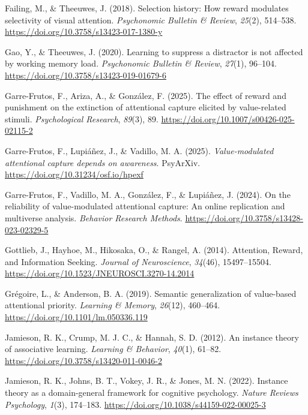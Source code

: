 \documentclass[
  jou,
  floatsintext,
  longtable,
  nolmodern,
  notxfonts,
  notimes,
  colorlinks=true,linkcolor=blue,citecolor=blue,urlcolor=blue]{apa7}
\newlength{\cslhangindent}
\newenvironment{CSLReferences}[2] %
 {\begin{list}{}{%
  \setlength{\itemindent}{0pt}
  \setlength{\leftmargin}{0pt}
  \setlength{\parsep}{0pt}
  \ifodd #1
   \setlength{\leftmargin}{\cslhangindent}
   \setlength{\itemindent}{-1\cslhangindent}
  \fi
  \setlength{\itemsep}{#2\baselineskip}}}
 {\end{list}}
\begin{document}
\begin{CSLReferences}{1}{0}
Failing, M., \& Theeuwes, J. (2018). Selection history: How reward
modulates selectivity of visual attention. \emph{Psychonomic Bulletin \&
Review}, \emph{25}(2), 514--538.
\url{https://doi.org/10.3758/s13423-017-1380-y}

Gao, Y., \& Theeuwes, J. (2020). Learning to suppress a distractor is
not affected by working memory load. \emph{Psychonomic Bulletin \&
Review}, \emph{27}(1), 96--104.
\url{https://doi.org/10.3758/s13423-019-01679-6}

Garre-Frutos, F., Ariza, A., \& González, F. (2025). The effect of
reward and punishment on the extinction of attentional capture elicited
by value-related stimuli. \emph{Psychological Research}, \emph{89}(3),
89. \url{https://doi.org/10.1007/s00426-025-02115-2}

Garre-Frutos, F., Lupiáñez, J., \& Vadillo, M. A. (2025).
\emph{Value-modulated attentional capture depends on awareness}.
PsyArXiv. \url{https://doi.org/10.31234/osf.io/hpexf}

Garre-Frutos, F., Vadillo, M. A., González, F., \& Lupiáñez, J. (2024).
On the reliability of value-modulated attentional capture: An online
replication and multiverse analysis. \emph{Behavior Research Methods}.
\url{https://doi.org/10.3758/s13428-023-02329-5}

Gottlieb, J., Hayhoe, M., Hikosaka, O., \& Rangel, A. (2014). Attention,
Reward, and Information Seeking. \emph{Journal of Neuroscience},
\emph{34}(46), 15497--15504.
\url{https://doi.org/10.1523/JNEUROSCI.3270-14.2014}

Grégoire, L., \& Anderson, B. A. (2019). Semantic generalization of
value-based attentional priority. \emph{Learning \& Memory},
\emph{26}(12), 460--464. \url{https://doi.org/10.1101/lm.050336.119}

Jamieson, R. K., Crump, M. J. C., \& Hannah, S. D. (2012). An instance
theory of associative learning. \emph{Learning \& Behavior},
\emph{40}(1), 61--82. \url{https://doi.org/10.3758/s13420-011-0046-2}

Jamieson, R. K., Johns, B. T., Vokey, J. R., \& Jones, M. N. (2022).
Instance theory as a domain-general framework for cognitive psychology.
\emph{Nature Reviews Psychology}, \emph{1}(3), 174--183.
\url{https://doi.org/10.1038/s44159-022-00025-3}


\end{CSLReferences}
\end{document}
